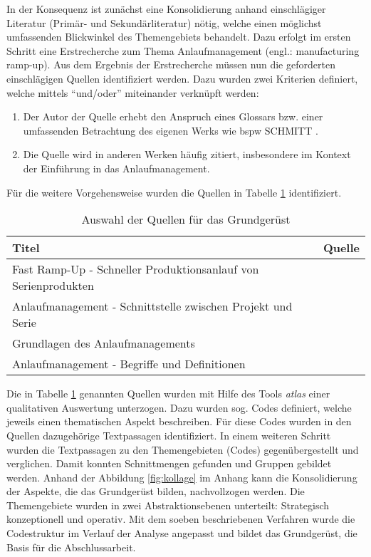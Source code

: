 In der Konsequenz ist zunächst eine Konsolidierung anhand einschlägiger Literatur (Primär- und Sekundärliteratur) nötig, welche einen möglichst umfassenden Blickwinkel des Themengebiets behandelt. Dazu erfolgt im ersten Schritt eine Erstrecherche zum Thema Anlaufmanagement (engl.: manufacturing ramp-up). Aus dem Ergebnis der Erstrecherche müssen nun die geforderten einschlägigen Quellen identifiziert werden. Dazu wurden zwei Kriterien definiert, welche mittels ``und/oder'' miteinander verknüpft werden: 
\begin{enumerate}
 \item Der Autor der Quelle erhebt den Anspruch eines Glossars bzw. einer umfassenden Betrachtung des eigenen Werks wie \gls{bspw} SCHMITT \autocite{Schmitt2015}. 
 \item Die Quelle wird in anderen Werken häufig zitiert, insbesondere im Kontext der Einführung in das Anlaufmanagement. 
\end{enumerate}

Für die weitere Vorgehensweise wurden die Quellen in Tabelle \ref{tab:quellengrundgeruest} identifiziert. 
% 
\begin{table}[h]
\caption{ Auswahl der Quellen für das Grundgerüst} \label{tab:quellengrundgeruest} 
\begin{center}
\begin{tabular}{l l}
\textbf{Titel} & \textbf{Quelle} \\ \hline
Fast Ramp-Up - Schneller Produktionsanlauf von Serienprodukten & \autocite{Kuhn2002} \\
Anlaufmanagement - Schnittstelle zwischen Projekt und Serie & \autocite{Bischoff2007} \\
Grundlagen des Anlaufmanagements & \autocite{Schuh2008} \\
Anlaufmanagement - Begriffe und Definitionen & \autocite{Schmitt2015} 
 \end{tabular} 
 \end{center}
\end{table}
% 
% 
Die in Tabelle \ref{tab:quellengrundgeruest} genannten Quellen wurden mit Hilfe des Tools \textit{\gls{atlas}} 
einer qualitativen Auswertung unterzogen. Dazu wurden sog. Codes definiert, welche jeweils einen thematischen Aspekt beschreiben. Für diese Codes wurden in den Quellen dazugehörige Textpassagen identifiziert. In einem weiteren Schritt wurden die Textpassagen zu den Themengebieten (Codes) gegenübergestellt und verglichen. Damit konnten Schnittmengen gefunden und Gruppen gebildet werden. 
Anhand der Abbildung \ref{fig:kollage} im Anhang kann die Konsolidierung der Aspekte, die das Grundgerüst bilden, nachvollzogen werden. 
Die Themengebiete wurden in zwei Abstraktionsebenen unterteilt: Strategisch konzeptionell und operativ.
Mit dem soeben beschriebenen Verfahren wurde die Codestruktur im Verlauf der Analyse angepasst und bildet das Grundgerüst, die Basis für die Abschlussarbeit. 


